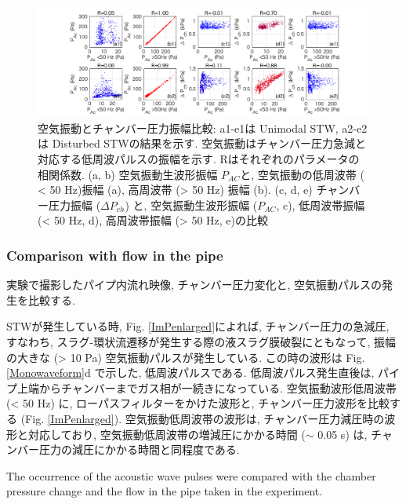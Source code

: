 \documentclass[12pt]{article}
\begin{document}
\begin{landscape}
\begin{figure}[H]
\begin{center}
\includegraphics[scale=1] {PAPCall.png} 
\caption[空気振動とチャンバー圧力振幅比較]
{空気振動とチャンバー圧力振幅比較: a1-e1は Unimodal STW, a2-e2は Disturbed STWの結果を示す. 空気振動はチャンバー圧力急減と対応する低周波パルスの振幅を示す. Rはそれぞれのパラメータの相関係数. (a, b) 空気振動生波形振幅 $P_{AC}$と, 空気振動の低周波帯 ( < 50 Hz)振幅 (a), 高周波帯 (> 50 Hz) 振幅 (b). (c, d, e) チャンバー圧力振幅 ($\Delta P_{ch}$) と, 空気振動生波形振幅 ($P_{AC}$, c), 低周波帯振幅 (< 50 Hz, d), 高周波帯振幅 (> 50 Hz, e)の比較}
\label{PAPCall}
\end{center}
\end{figure} 
\end{landscape}




\clearpage
\subsubsection{Comparison with flow in the pipe}
実験で撮影したパイプ内流れ映像, チャンバー圧力変化と, 空気振動パルスの発生を比較する.

STWが発生している時, Fig. \ref{ImPenlarged}によれば, チャンバー圧力の急減圧, すなわち, スラグ-環状流遷移が発生する際の液スラグ膜破裂にともなって, 振幅の大きな (> 10 Pa) 空気振動パルスが発生している. 
この時の波形は Fig. \ref{Monowaveform}d で示した, 低周波パルスである. 
低周波パルス発生直後は, パイプ上端からチャンバーまでガス相が一続きになっている.
空気振動波形低周波帯 (< 50 Hz) に, ローパスフィルターをかけた波形と, チャンバー圧力波形を比較する (Fig. \ref{ImPenlarged}). 
空気振動低周波帯の波形は, チャンバー圧力減圧時の波形と対応しており, 空気振動低周波帯の増減圧にかかる時間 ($\sim$ 0.05 s) は, チャンバー圧力の減圧にかかる時間と同程度である.

The occurrence of the acoustic wave pulses were compared with the chamber pressure change and the flow in the pipe taken in the experiment.
\end{document}
